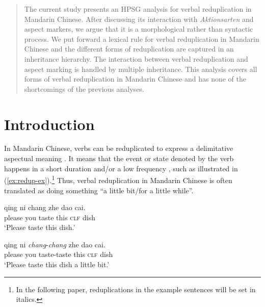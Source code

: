 \documentclass[11pt,a4paper,fleqn,draft]{article}
\let\textbf\emph
\begin{document}


\begin{abstract}

The current study presents an HPSG analysis for verbal reduplication in Mandarin Chinese. 
After discussing its interaction with \emph{Aktionsarten} and aspect markers, 
we argue that it is a morphological rather than syntactic process.
We put forward a lexical rule for verbal reduplication in Mandarin Chinese
and the different forms of reduplication are captured in an inheritance hierarchy.
The interaction between verbal reduplication and aspect marking is handled by multiple inheritance.
This analysis covers all forms of verbal reduplication in Mandarin Chinese 
and has none of the shortcomings of the previous analyses.

\end{abstract}



\section{Introduction}\label{ch:intro}

In Mandarin Chinese, verbs can be reduplicated to express a delimitative aspectual meaning \citep[e.g.][]{Chao1968, Chen2001, Dai1997, Li1996, LiThompson1981, Tsao2001, XiaoMcEnery2004, Yang2003, Zhu1998}. 
It means that the event or state denoted by the verb happens in a short duration and/or a low
frequency \citep[155]{XiaoMcEnery2004}, such as illustrated in (\ref{ex:redup-ex}).\footnote{In the
  following paper, reduplications in the example sentences will be set in italics.}
Thus, verbal reduplication in Mandarin Chinese is often translated as doing something ``a little bit/for a little while”.

\setlength{\columnsep}{-27pt}
\ea\label{ex:redup-ex}
\begin{multicols}{2}
	\ea
	\gll qing ni chang zhe dao cai.\\
	please you taste this \textsc{clf} dish\\
	\glt `Please taste this dish.'
	
	\ex
	\gll qing ni \textbf{chang}-\textbf{chang} zhe dao cai.\\
	please you taste-taste this \textsc{clf} dish\\
	\glt `Please taste this dish a little bit.' 
	\z
\end{multicols}
\z
\end{document}
